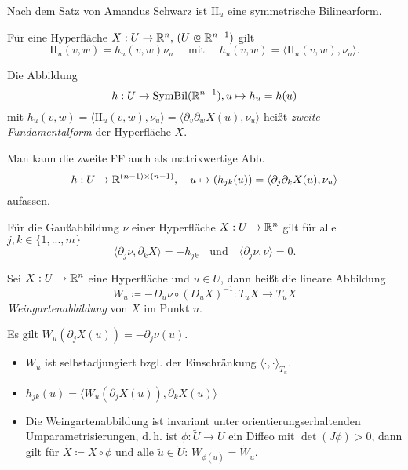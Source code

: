 \documentclass{cheat-sheet}
\newcommand{\SymBil}{\mathrm{SymBil}}
\newcommand{\II}{\mathrm{I\!I}}
\begin{document}
\begin{bem}
  Nach dem Satz von Amandus Schwarz ist $\II_u$ eine symmetrische Bilinearform.
\end{bem}

\begin{bem}
  Für eine Hyperfläche $X : U \to \R^n, \, (U \opn \R^{n-1})$ gilt
  \[ \II_u(v, w) = h_u(v, w) \nu_u \quad \text{ mit } \quad h_u(v, w) = \langle \II_u(v, w) , \nu_u \rangle. \]
\end{bem}

\begin{defn}
  Die Abbildung
  \[ h : U \to \SymBil(\R^{n-1}), u \mapsto h_u = h(u) \]
  mit $h_u(v, w) = \langle \II_u(v, w), \nu_u \rangle = \langle \partial_v \partial_w X(u), \nu_u \rangle$ heißt \emph{zweite Fundamentalform} der Hyperfläche $X$.
\end{defn}

\begin{bem}
  Man kann die zweite FF auch als matrixwertige Abb.
  \[ h : U \to \mathbb{R}^{(n-1) \times (n-1)}, \quad u \mapsto (h_{jk}(u)) = \langle \partial_j \partial_k X(u), \nu_u \rangle \]
  aufassen.
\end{bem}

\begin{satz}
  Für die Gaußabbildung $\nu$ einer Hyperfläche $X : U \to \mathbb{R}^n$ gilt für alle $j, k \in \{ 1, ..., m \}$
  \[ \langle \partial_j \nu , \partial_k X \rangle = - h_{jk} \quad \text{und} \quad \langle \partial_j \nu, \nu \rangle = 0. \]
\end{satz}

\begin{defn}
  Sei $X : U \to \mathbb{R}^n$ eine Hyperfläche und $u \in U$, dann heißt die lineare Abbildung
  \[ W_u \coloneqq - D_u \nu \circ (D_u X)^{-1} : T_u X \to T_u X \]
  \emph{Weingartenabbildung} von $X$ im Punkt $u$.
\end{defn}

\begin{bem}
  Es gilt $W_u(\partial_j X(u)) = - \partial_j \nu(u)$.
\end{bem}

\begin{satz}
  \begin{itemize}
    \item $W_u$ ist selbstadjungiert bzgl. der Einschränkung $\langle \cdot , \cdot \rangle_{T_u}$.
    \item $h_{jk}(u) = \langle W_u(\partial_j X(u)), \partial_k X(u) \rangle$
    \item Die Weingartenabbildung ist invariant unter orientierungserhaltenden Umparametrisierungen, d.\,h. ist $\phi : \tilde{U} \to U$ ein Diffeo mit $\det(J\phi) > 0$, dann gilt für $\tilde{X} \coloneqq X \circ \phi$ und alle $\tilde{u} \in \tilde{U}$: $W_{\phi(\tilde{u})} = \tilde{W}_{\tilde{u}}$.
  \end{itemize}
\end{satz}
\end{document}
